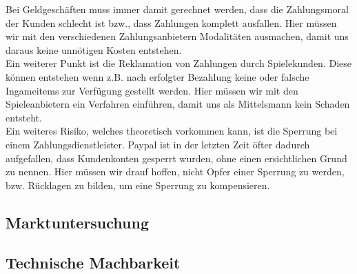 \documentclass[a4paper,10pt]{article}
\begin{document}
Bei Geldgeschäften muss immer damit gerechnet werden, dass die Zahlungsmoral der Kunden schlecht ist bzw., dass Zahlungen komplett ausfallen. Hier müssen wir mit den verschiedenen Zahlungsanbietern Modalitäten ausmachen, damit uns daraus keine unnötigen Kosten entstehen.\\
Ein weiterer Punkt ist die Reklamation von Zahlungen durch Spielekunden. Diese können entstehen wenn z.B. nach erfolgter Bezahlung keine oder falsche Ingameitems zur Verfügung gestellt werden. Hier müssen wir mit den Spieleanbietern ein Verfahren einführen, damit uns als Mittelsmann kein Schaden entsteht.\\
Ein weiteres Risiko, welches theoretisch vorkommen kann, ist die Sperrung bei einem Zahlungsdienstleister. Paypal ist in der letzten Zeit öfter dadurch aufgefallen, dass Kundenkonten gesperrt wurden, ohne einen ersichtlichen Grund zu nennen. Hier müssen wir drauf hoffen, nicht Opfer einer Sperrung zu werden, bzw. Rücklagen zu bilden, um eine Sperrung zu kompensieren.

\subsection{Marktuntersuchung}\label{labelMarktuntersuchung}


\subsection{Technische Machbarkeit}\label{labelTechMach}


\end{document}
